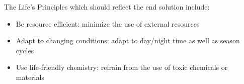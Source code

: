 The Life's Principles which should reflect the end solution include:

\begin{itemize}
  \item Be resource efficient: minimize the use of external resources
  \item Adapt to changing conditions: adapt to day/night time as well as season cycles
  \item Use life-friendly chemistry: refrain from the use of toxic chemicals or materials
\end{itemize}

\clearpage
